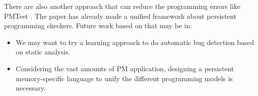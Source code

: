 \documentclass{sig-alternate}
\begin{document}
There are also another approach that can reduce the programming errors like PMTest \cite{PMtest01}. The paper has already made a unified framework about persistent programming checkers. Future work based on that may be in:
\begin{itemize}
\item We may want to try a learning approach to do automatic bug detection based on static analysis. 
\item Considering the vast amounts of PM application, designing a persistent memory-specific language to unify the different programming models is necessary.
\end{itemize}





\end{document}

